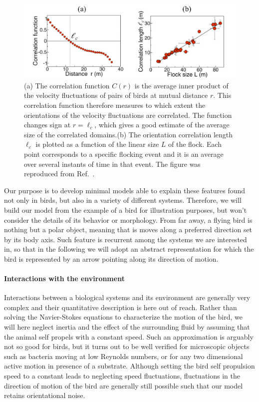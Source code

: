 \begin{figure}[h]
\begin{center}
	\includegraphics[width=.75\textwidth]{Figures/scalefree.pdf}
	\caption{(a) The correlation function $C(r)$ is the average inner product of the velocity fluctuations of pairs of birds at mutual distance $r$. This correlation function therefore measures to which extent the orientations of the velocity fluctuations are correlated. The function changes sign at $r=\ell_c$, which gives a good estimate of the average size of the correlated domains.(b) The orientation correlation length $\ell_c$ is plotted as a function of the linear size $L$ of the flock. Each point corresponds to a specific flocking event and it is an average over several instants of time in that event. The figure was reproduced from Ref.~\cite{cavagna2010scale}.
	}
	\label{scalefree}
	\end{center}
\end{figure}

Our purpose is to develop minimal models able to explain these features found not only in birds, but also in a variety of different systems.
Therefore, we will build our model from the example of a bird for illustration purposes, but won't consider the details of its behavior or morphology.
From far away, a flying bird is nothing but a polar object, meaning that is moves along a preferred direction set by its body axis.
Such feature is recurrent among the systems we are interested in, so that in the following we will  adopt an abstract representation
for which the bird is represented by an arrow pointing along its direction of motion.

\paragraph*{Interactions with the environment}
Interactions between a biological systems and its environment are generally very complex and their quantitative description is here out of reach. 
Rather than solving the Navier-Stokes equations
to characterize the motion of the bird, 
we will here neglect inertia and the effect of the surrounding fluid by assuming that the animal self propels with a constant speed.
Such an approximation is arguably not so good for birds, but it turns out to be well verified for microscopic objects such as bacteria moving at low Reynolds numbers, or for any two dimensional active motion in presence of a substrate.
Although setting the bird self propulsion speed to a constant leads to neglecting speed fluctuations, fluctuations in the direction of motion of the bird are generally still possible such that our model retains orientational noise. 
 
